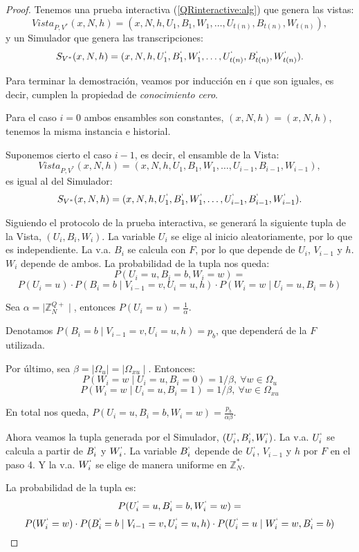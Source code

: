 \begin{proof}
	
	\hfil
	
	Tenemos una prueba interactiva (\ref{QRinteractive:alg}) que genera las vistas:
	\[ Vista_{P,V^*}(x,N,h) = (x,N,h,U_1,B_1,W_1,\dots , U_{t(n)}, B_{t(n)}, W_{t(n)}), \]
	y un Simulador que genera las transcripciones:
	\[ S_{V^*}(x,N,h)= (x,N,h,U_1^`,B_1^`,W_1^`,\dots , U_{t(n)}^`, B_{t(n)}^`, W_{t(n)}^`).\]
	
	Para terminar la demostración, veamos por inducción en $i$ que son iguales, es decir, cumplen la propiedad de \textit{conocimiento cero}.
	
	Para el caso $i=0$ ambos ensambles son constantes, $(x,N,h)=(x,N,h)$, tenemos la misma instancia e historial.
	
	Suponemos cierto el caso $i-1$, es decir, el ensamble de la Vista:
	\[ Vista_{P,V^*}(x,N,h) = (x,N,h,U_1,B_1,W_1,\dots , U_{i-1}, B_{i-1}, W_{i-1}), \]
	es igual al del Simulador:
	\[ S_{V^*}(x,N,h)= (x,N,h,U_1^`,B_1^`,W_1^`,\dots , U_{i-1}^`, B_{i-1}^`, W_{i-1}^`). \]
	

	Siguiendo el protocolo de la prueba interactiva, se generará la siguiente tupla de la Vista, $(U_i, B_i, W_i)$. La variable $U_i$ se elige al inicio aleatoriamente, por lo que es independiente. La v.a. $B_i$ se calcula con $F$, por lo que depende de $U_i$, $V_{i-1}$ y $h$. $W_i$ depende de ambos. La probabilidad de la tupla nos queda:
	\[
	P(U_i=u, B_i=b, W_i=w) = 
	\]
	\[ P(U_i=u)\cdot P(B_i=b \mid V_{i-1}=v, U_i=u,h) \cdot P(W_i=w \mid U_i=u, B_i=b) \]
	
	Sea $\alpha = \mid \mathbb{Z}^{Q+}_N \mid $, entonces $P(U_i=u) = \frac{1}{\alpha}$.
	
	Denotamos $ P(B_i=b \mid V_{i-1}=v, U_i=u,h)=p_b$, que dependerá de la $F$ utilizada.
	
	Por último, sea $\beta = \mid \Omega_u \mid = \mid \Omega_{xu} \mid $. Entonces:
	\[P(W_i=w \mid U_i=u, B_i=0) = 1/\beta,\ \forall w \in \Omega_u\]
	\[P(W_i=w \mid U_i=u, B_i=1) = 1/\beta,\ \forall w \in \Omega_{xu}\]
	
	En total nos queda, $P(U_i=u, B_i=b, W_i=w) = \frac{p_b}{\alpha \beta}$.
	
	
	Ahora veamos la tupla generada por el Simulador, $(U_i^`, B_i^`, W_i^`)$. La v.a. $U_i^`$ se calcula a partir de $B_i^`$ y $W_i^`$. La variable $B_i^`$ depende de $U_i^`$, $V_{i-1}$ y $h$ por $F$ en el paso 4. Y la v.a. $W_i^`$ se elige de manera uniforme en $\mathbb{Z}_N^*$.
	
	La probabilidad de la tupla es:
	\[P(U_i^`=u, B_i^`=b, W_i^`=w) = \]
	\[P(W_i^`=w)\cdot P(B_i^`=b \mid V_{i-1}=v, U_i^`=u,h) \cdot P(U_i^`=u \mid W_i^`=w, B_i^`=b)\]
	

\end{proof}
